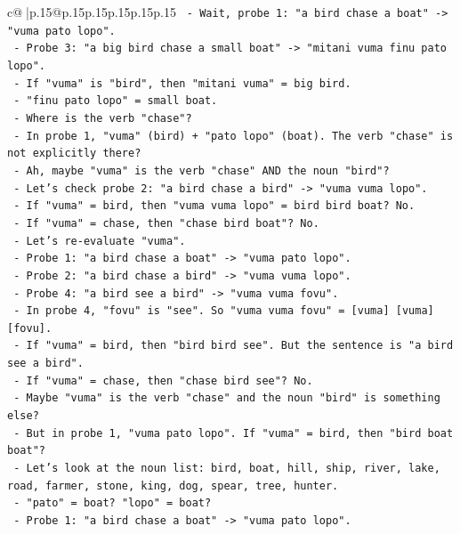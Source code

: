 \documentclass{article}
\begin{document}
{\begin{supertabular}{c@{$\;$}|p{.15\linewidth}@{}p{.15\linewidth}p{.15\linewidth}p{.15\linewidth}p{.15\linewidth}p{.15\linewidth}}
{{{\texttt{    {-} Wait, probe 1: "a bird chase a boat" {-}> "vuma pato lopo".} \\
\texttt{    {-} Probe 3: "a big bird chase a small boat" {-}> "mitani vuma finu pato lopo".} \\
\texttt{    {-} If "vuma" is "bird", then "mitani vuma" = big bird.} \\
\texttt{    {-} "finu pato lopo" = small boat.} \\
\texttt{    {-} Where is the verb "chase"?} \\
\texttt{    {-} In probe 1, "vuma" (bird) + "pato lopo" (boat). The verb "chase" is not explicitly there?} \\
\texttt{    {-} Ah, maybe "vuma" is the verb "chase" AND the noun "bird"?} \\
\texttt{    {-} Let's check probe 2: "a bird chase a bird" {-}> "vuma vuma lopo".} \\
\texttt{      {-} If "vuma" = bird, then "vuma vuma lopo" = bird bird boat? No.} \\
\texttt{      {-} If "vuma" = chase, then "chase bird boat"? No.} \\
\texttt{    {-} Let's re{-}evaluate "vuma".} \\
\texttt{      {-} Probe 1: "a bird chase a boat" {-}> "vuma pato lopo".} \\
\texttt{      {-} Probe 2: "a bird chase a bird" {-}> "vuma vuma lopo".} \\
\texttt{      {-} Probe 4: "a bird see a bird" {-}> "vuma vuma fovu".} \\
\texttt{      {-} In probe 4, "fovu" is "see". So "vuma vuma fovu" = {[}vuma{]} {[}vuma{]} {[}fovu{]}.} \\
\texttt{      {-} If "vuma" = bird, then "bird bird see". But the sentence is "a bird see a bird".} \\
\texttt{      {-} If "vuma" = chase, then "chase bird see"? No.} \\
\texttt{      {-} Maybe "vuma" is the verb "chase" and the noun "bird" is something else?} \\
\texttt{      {-} But in probe 1, "vuma pato lopo". If "vuma" = bird, then "bird boat boat"?} \\
\texttt{      {-} Let's look at the noun list: bird, boat, hill, ship, river, lake, road, farmer, stone, king, dog, spear, tree, hunter.} \\
\texttt{      {-} "pato" = boat? "lopo" = boat?} \\
\texttt{      {-} Probe 1: "a bird chase a boat" {-}> "vuma pato lopo".} \\
}}}
\end{supertabular}}
\end{document}
